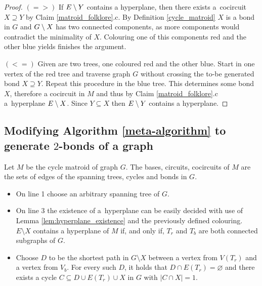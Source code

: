 \begin{proof}
	$(=>)$
	If $E \setminus Y$ contains a hyperplane, then there exists a~cocircuit $X \supseteq Y$ by Claim \ref{matroid_folklore}.c. By Definition \ref{cycle_matroid} $X$ is a bond in $G$ and $G \setminus X$ has two connected components, as more components would contradict the minimality of $X$. Colouring one of this components red and the other blue yields finishes the argument.

	$(<=)$ Given are two trees, one coloured red and the other blue. Start in one vertex of the red tree and traverse graph $G$ without crossing the to-be generated bond $X \supseteq Y$. Repeat this procedure in the blue tree. This determines some bond $X$, therefore a cocircuit in $M$ and thus by Claim \ref{matroid_folklore}.c a~hyperplane $E \setminus X$. Since $Y \subseteq X$ then $E \setminus Y$ contains a hyperplane.

\end{proof}


\subsection*{Modifying Algorithm \ref{meta-algorithm} to generate $2$-bonds of a graph}

\begin{rec}
	Let $M$ be the cycle matroid of graph $G$. The bases, circuits, cocircuits of $M$ are the sets of edges of the spanning trees, cycles and bonds in $G$.
\end{rec}

\begin{itemize}
	\item On line 1 choose an arbitrary spanning tree of $G$.

	\item On line 3 the existence of a~hyperplane can be easily decided with use of Lemma \ref{lem:hyperplane_existence} and the previously defined colouring. $E \setminus X$ contains a hyperplane of $M$ if, and only if, $T_r$ and $T_b$ are both connected subgraphs of $G$.

	\item Choose $D$ to be the shortest path in $G \setminus X$ between a vertex from $V(T_r)$ and a vertex from $V_b$. For every such $D$, it holds that $D \cap E(T_r) = \varnothing$ and there exists a cycle $C \subseteq D \cup E(T_r) \cup X$ in $G$ with $\lvert C \cap X \rvert = 1$.

\end{itemize}

